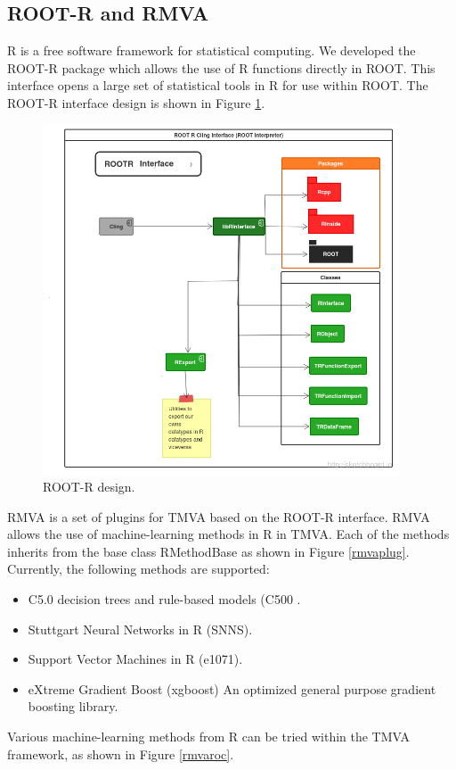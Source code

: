 \documentclass[a4paper]{jpconf}
\begin{document}
\clearpage
\subsection{ROOT-R and RMVA}\label{ROOTR}
R  is a free software framework for statistical computing\cite{R}. We developed the ROOT-R package which allows the  use of R functions directly in ROOT. This interface opens a large set of statistical tools in R for use within ROOT. The ROOT-R interface design is shown in Figure \ref{rootr:label}. 


\begin{figure}[h]
\centering
\includegraphics[width=25pc]{img/rootr.png}\caption{\label{rootr:label} ROOT-R design.}
\end{figure}
RMVA is a set of plugins for TMVA based on the ROOT-R interface. RMVA allows the use of machine-learning methods in R in TMVA.  Each of the methods inherits from the base class RMethodBase as shown in Figure \ref{rmvaplug}. Currently, the following methods are supported: 

\begin{itemize}  
\item C5.0 decision trees and rule-based models (C500 \cite{c50}.
\item Stuttgart Neural Networks in R (SNNS)\cite{rsnns}.
\item Support Vector Machines in R (e1071)\cite{e1071}.
\item eXtreme Gradient Boost (xgboost) An optimized
general purpose gradient boosting library\cite{chen2015xgboost}.
\end{itemize}
Various machine-learning methods from R can be tried within the TMVA framework, as shown in Figure \ref{rmvaroc}.
\end{document}
